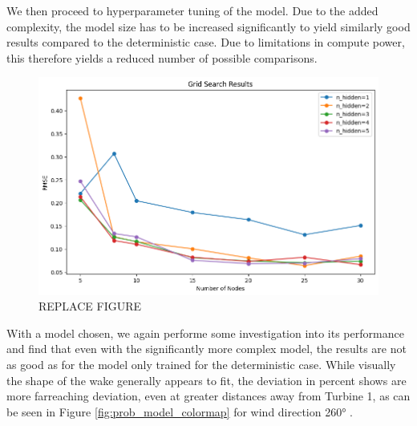 We then proceed to hyperparameter tuning of the model. Due to the added complexity, the model size has to be increased significantly to yield similarly good results compared to the deterministic case. Due to limitations in compute power, this therefore yields a reduced number of possible comparisons.


\begin{figure}[h] 
	\centering
	\includegraphics[width=1\textwidth]{figures/optimization/determ_nn_opti.png} 
	\caption{REPLACE FIGURE}
	\label{fig:determ_nn_opti}
\end{figure}



With a model chosen, we again performe some investigation into its performance and find that even with the significantly more complex model, the results are not as good as for the model only trained for the deterministic case. While visually the shape of the wake generally appears to fit, the deviation in percent shows are more farreaching deviation, even at greater distances away from Turbine 1, as can be seen in Figure \ref{fig:prob_model_colormap} for wind direction 260° . 

